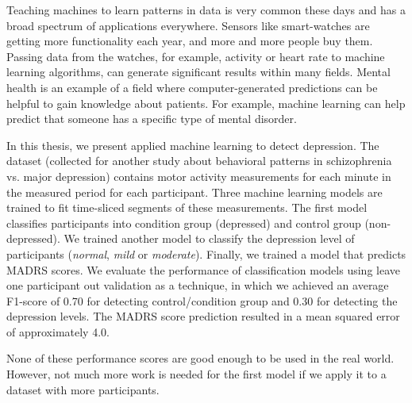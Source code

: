 Teaching machines to learn patterns in data is very common these days and has a broad spectrum of applications everywhere. Sensors like smart-watches are getting more functionality each year, and more and more people buy them. Passing data from the watches, for example, activity or heart rate to machine learning algorithms, can generate significant results within many fields. Mental health is an example of a field where computer-generated predictions can be helpful to gain knowledge about patients. For example, machine learning can help predict that someone has a specific type of mental disorder.

In this thesis, we present applied machine learning to detect depression. The dataset (collected for another study about behavioral patterns in schizophrenia vs. major depression) contains motor activity measurements for each minute in the measured period for each participant. Three machine learning models are trained to fit time-sliced segments of these measurements. The first model classifies participants into  condition group (depressed) and control group (non-depressed). We trained another model to classify the depression level of participants (\emph{normal}, \emph{mild} or \emph{moderate}). Finally, we trained a model that predicts MADRS scores. We evaluate the performance of classification models using leave one participant out validation as a technique, in which we achieved an average F1-score of 0.70 for detecting control/condition group and 0.30 for detecting the depression levels. The MADRS score prediction resulted in a mean squared error of approximately 4.0. 

None of these performance scores are good enough to be used in the real world. However, not much more work is needed for the first model if we apply it to a dataset with more participants.